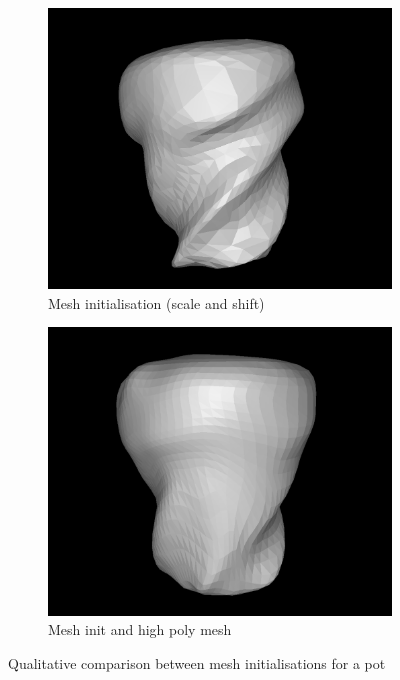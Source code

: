 \documentclass{article}
\begin{document}
\begin{figure}[h!]
  \begin{subfigure}{.2\textwidth}
    \centering
    \includegraphics[width=\textwidth]{images/potmesh_b.png}
    \caption{Mesh initialisation (scale and shift)}
    \label{results-pot-mesh3}
  \end{subfigure}
  \hfill
  \begin{subfigure}{.2\textwidth}
    \centering
    \includegraphics[width=\textwidth]{images/potmesh_c.png}
    \caption{Mesh init and high poly mesh}
    \label{results-pot-png}
  \end{subfigure}
  \caption{Qualitative comparison between mesh initialisations for a pot}
  \label{results-pot}
\end{figure}
\end{document}
